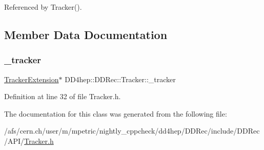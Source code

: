 Referenced by Tracker().



\subsection{Member Data Documentation}
\hypertarget{class_d_d4hep_1_1_d_d_rec_1_1_tracker_a93fc69a19d898507a7c887b9f44b4663}{}\label{class_d_d4hep_1_1_d_d_rec_1_1_tracker_a93fc69a19d898507a7c887b9f44b4663} 
\subsubsection{\texorpdfstring{\+\_\+tracker}{\_tracker}}
{\footnotesize\ttfamily \hyperlink{class_d_d4hep_1_1_d_d_rec_1_1_tracker_extension}{Tracker\+Extension}$\ast$ D\+D4hep\+::\+D\+D\+Rec\+::\+Tracker\+::\+\_\+tracker\hspace{0.3cm}{\ttfamily [protected]}}



Definition at line 32 of file Tracker.\+h.



The documentation for this class was generated from the following file\+:\begin{DoxyCompactItemize}
\item 
/afs/cern.\+ch/user/m/mpetric/nightly\+\_\+cppcheck/dd4hep/\+D\+D\+Rec/include/\+D\+D\+Rec/\+A\+P\+I/\hyperlink{_tracker_8h}{Tracker.\+h}\end{DoxyCompactItemize}
